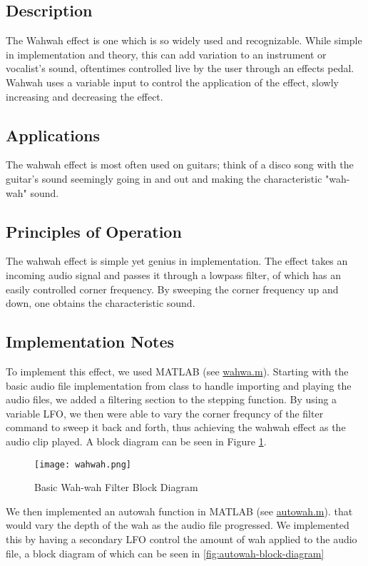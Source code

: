 \subsection{Description}
The Wahwah effect is one which is so widely used and recognizable. While simple in implementation and theory, this can add variation to an instrument or vocalist's sound, oftentimes controlled live by the user through an effects pedal. Wahwah uses a variable input to control the application of the effect, slowly increasing and decreasing the effect.

\subsection{Applications}
The wahwah effect is most often used on guitars; think of a disco song with the guitar's sound seemingly going in and out and making the characteristic "wah-wah" sound.

\subsection{Principles of Operation}
The wahwah effect is simple yet genius in implementation. The effect takes an incoming audio signal and passes it through a lowpass filter, of which has an easily controlled corner frequency. By sweeping the corner frequency up and down, one obtains the characteristic sound.

\subsection{Implementation Notes}
To implement this effect, we used MATLAB (see \href{run:../wahwa.m}{wahwa.m}). Starting with the basic audio file implementation from class to handle importing and playing the audio files, we added a filtering section to the stepping function. By using a variable LFO, we then were able to vary the corner frequncy of the filter command to sweep it back and forth, thus achieving the wahwah effect as the audio clip played. A block diagram can be seen in Figure \ref{fig:Wahwah-block-diagram}.
\begin{figure}[ht]
	\centering
	\texttt{[image: wahwah.png]}
	\caption{Basic Wah-wah Filter Block Diagram}
	\label{fig:Wahwah-block-diagram}
\end{figure}

We then implemented an autowah function in MATLAB (see \href{run:../autowah.m}{autowah.m}). that would vary the depth of the wah as the audio file progressed. We implemented this by having a secondary LFO control the amount of wah applied to the audio file, a block diagram of which can be seen in \ref{fig:autowah-block-diagram}

